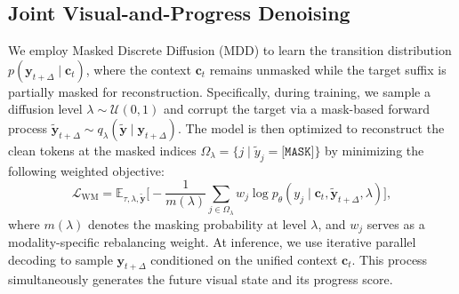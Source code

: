 \subsection{Joint Visual-and-Progress Denoising}
\label{sec:backbone}
We employ Masked Discrete Diffusion (MDD) to learn the transition distribution $p(\mathbf{y}_{t+\Delta} \mid \mathbf{c}_t)$, where the context $\mathbf{c}_t$ remains unmasked while the target suffix is partially masked for reconstruction. Specifically, during training, we sample a diffusion level $\lambda \sim \mathcal{U}(0,1)$ and corrupt the target via a mask-based forward process $\tilde{\mathbf{y}}_{t+\Delta} \sim q_\lambda(\tilde{\mathbf{y}} \mid \mathbf{y}_{t+\Delta})$. The model is then optimized to reconstruct the clean tokens at the masked indices $\Omega_\lambda = \{j \mid \tilde y_j = \texttt{[MASK]}\}$ by minimizing the following weighted objective:
\begin{equation}
\mathcal{L}_{\text{WM}}
=
\mathbb{E}_{\tau,\lambda,\tilde{\mathbf{y}}}
\Bigg[
-\frac{1}{m(\lambda)}
\sum_{j\in\Omega_\lambda}
w_j \log p_\theta\!\left(
y_j \mid
\mathbf{c}_t,\tilde{\mathbf{y}}_{t+\Delta},\lambda
\right)
\Bigg],
\label{eq:loss_total}
\end{equation}
where $m(\lambda)$ denotes the masking probability at level $\lambda$, and $w_j$ serves as a modality-specific rebalancing weight. At inference, we use iterative parallel decoding to sample $\mathbf{y}_{t+\Delta}$ conditioned on the unified context $\mathbf{c}_t$. This process simultaneously generates the future visual state and its progress score.
